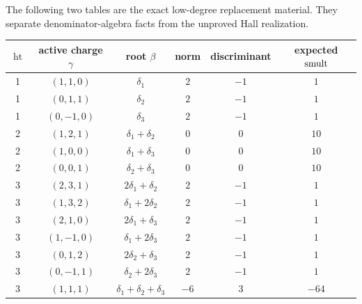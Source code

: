 The following two tables are the exact low-degree replacement material.
They separate denominator-algebra facts from the unproved Hall
realization.

\begin{center}
\begingroup
\small
\begin{tabular}{c|c|c|c|c|c}
\(\operatorname{ht}\) & active charge \(\gamma\) & root \(\beta\) &
norm & discriminant & expected \(\operatorname{smult}\)\\
\hline
1 & \((1,1,0)\) & \(\delta_1\) & \(2\) & \(-1\) & \(1\)\\
1 & \((0,1,1)\) & \(\delta_2\) & \(2\) & \(-1\) & \(1\)\\
1 & \((0,-1,0)\) & \(\delta_3\) & \(2\) & \(-1\) & \(1\)\\
2 & \((1,2,1)\) & \(\delta_1+\delta_2\) & \(0\) & \(0\) & \(10\)\\
2 & \((1,0,0)\) & \(\delta_1+\delta_3\) & \(0\) & \(0\) & \(10\)\\
2 & \((0,0,1)\) & \(\delta_2+\delta_3\) & \(0\) & \(0\) & \(10\)\\
3 & \((2,3,1)\) & \(2\delta_1+\delta_2\) & \(2\) & \(-1\) & \(1\)\\
3 & \((1,3,2)\) & \(\delta_1+2\delta_2\) & \(2\) & \(-1\) & \(1\)\\
3 & \((2,1,0)\) & \(2\delta_1+\delta_3\) & \(2\) & \(-1\) & \(1\)\\
3 & \((1,-1,0)\) & \(\delta_1+2\delta_3\) & \(2\) & \(-1\) & \(1\)\\
3 & \((0,1,2)\) & \(2\delta_2+\delta_3\) & \(2\) & \(-1\) & \(1\)\\
3 & \((0,-1,1)\) & \(\delta_2+2\delta_3\) & \(2\) & \(-1\) & \(1\)\\
3 & \((1,1,1)\) & \(\delta_1+\delta_2+\delta_3\) & \(-6\) & \(3\) & \(-64\)
\end{tabular}
\endgroup
\end{center}

